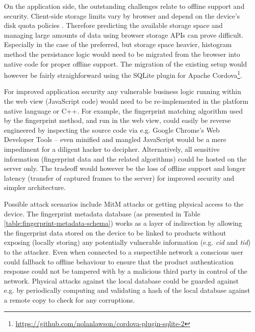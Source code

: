 \documentclass[thesis.tex]{subfiles}
\begin{document}
On the application side, the outstanding challenges relate to offline support and security. Client-side storage limits vary by browser and depend on the device's disk quota policies \cite{mobile-browser-quota}. Therefore predicting the available storage space and managing large amounts of data using browser storage APIs can prove difficult. Especially in the case of the preferred, but storage space heavier, histogram method the persistance logic would need to be migrated from the browser into native code for proper offline support. The migration of the existing setup would however be fairly straighforward using the SQLite plugin for Apache Cordova\footnote{\url{https://github.com/nolanlawson/cordova-plugin-sqlite-2}}.

For improved application security any vulnerable business logic running within the web view (JavaScript code) would need to be re-implemented in the platform native language or C++. For example, the fingerprint matching algorithm used by the fingerprint method, and run in the web view, could easily be reverse engineered by inspecting the source code via e.g. Google Chrome's Web Developer Tools -- even minified and mangled JavaScript would be a mere impediment for a diligent hacker to decipher. Alternatively, all sensitive information (fingerprint data and the related algorithms) could be hosted on the server only. The tradeoff would however be the loss of offline support and longer latency (transfer of captured frames to the server) for improved security and simpler architecture.

Possible attack scenarios include MitM attacks or getting physical access to the device. The fingerprint metadata database (as presented in Table \ref{table:fingerprint-metadata-schema}) works as a layer of indirection by allowing the fingerprint data stored on the device to be linked to products without exposing (locally storing) any potentially vulnerable information (e.g. \emph{cid} and \emph{tid}) to the attacker. Even when connected to a suspectible network a conscious user could fallback to offline behaviour to ensure that the product authentication response could not be tampered with by a malicious third party in control of the network. Physical attacks against the local database could be guarded against e.g. by periodically computing and validating a hash of the local database against a remote copy to check for any corruptions.
\end{document}
